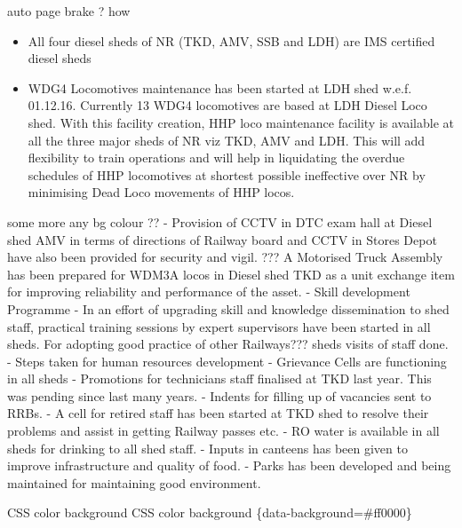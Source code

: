 \documentclass[
  ignorenonframetext,
]{beamer}
\providecommand{\tightlist}{%
  \setlength{\itemsep}{0pt}\setlength{\parskip}{0pt}}
\begin{document}
\begin{frame}{auto page brake ? how}
\protect\hypertarget{auto-page-brake-how}{}
\begin{itemize}[<+->]
\tightlist
\item
  All four diesel sheds of NR (TKD, AMV, SSB and LDH) are IMS certified
  diesel sheds
\item
  WDG4 Locomotives maintenance has been started at LDH shed w.e.f.
  01.12.16. Currently 13 WDG4 locomotives are based at LDH Diesel Loco
  shed. With this facility creation, HHP loco maintenance facility is
  available at all the three major sheds of NR viz TKD, AMV and LDH.
  This will add flexibility to train operations and will help in
  liquidating the overdue schedules of HHP locomotives at shortest
  possible ineffective over NR by minimising Dead Loco movements of HHP
  locos.
\end{itemize}
\end{frame}

\begin{frame}{some more}
\protect\hypertarget{some-more}{}
any bg colour ?? - Provision of CCTV in DTC exam hall at Diesel shed AMV
in terms of directions of Railway board and CCTV in Stores Depot have
also been provided for security and vigil. ??? A Motorised Truck
Assembly has been prepared for WDM3A locos in Diesel shed TKD as a unit
exchange item for improving reliability and performance of the asset. -
Skill development Programme - In an effort of upgrading skill and
knowledge dissemination to shed staff, practical training sessions by
expert supervisors have been started in all sheds. For adopting good
practice of other Railways??? sheds visits of staff done. - Steps taken
for human resources development - Grievance Cells are functioning in all
sheds - Promotions for technicians staff finalised at TKD last year.
This was pending since last many years. - Indents for filling up of
vacancies sent to RRBs. - A cell for retired staff has been started at
TKD shed to resolve their problems and assist in getting Railway passes
etc. - RO water is available in all sheds for drinking to all shed
staff. - Inputs in canteens has been given to improve infrastructure and
quality of food. - Parks has been developed and being maintained for
maintaining good environment.
\end{frame}

\begin{frame}{CSS color background}
\protect\hypertarget{css-color-background}{}
CSS color background \{data-background=\#ff0000\}
\end{frame}
\end{document}
